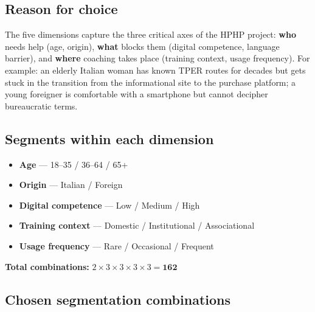 ﻿\documentclass[11pt,a4paper]{article}
\begin{document}
\vspace{0.4cm}

\subsection{Reason for choice}

The five dimensions capture the three critical axes of the HPHP project:
\textbf{who} needs help (age, origin), \textbf{what} blocks them
(digital competence, language barrier), and \textbf{where} coaching
takes place (training context, usage frequency). For example:
an elderly Italian woman has known TPER routes for decades but gets stuck in the
transition from the informational site to the purchase platform; a young
foreigner is comfortable with a smartphone but cannot decipher bureaucratic
terms.

\vspace{0.4cm}

\begin{tcolorbox}[base]
\subsection{Segments within each dimension}
\begin{itemize}[leftmargin=*,itemsep=4pt]
\item \textbf{Age} --- 18--35 / 36--64 / 65+
\item \textbf{Origin} --- Italian / Foreign
\item \textbf{Digital competence} --- Low / Medium / High
\item \textbf{Training context} --- Domestic / Institutional /
Associational
\item \textbf{Usage frequency} --- Rare / Occasional / Frequent
\end{itemize}
\end{tcolorbox}

\vspace{0.2cm}
\begin{flushleft}
\textbf{Total combinations:}
\quad $2 \times 3 \times 3 \times 3 \times 3 = \mathbf{162}$
\end{flushleft}
\vspace{0.2cm}

\subsection{Chosen segmentation combinations}
\end{document}
